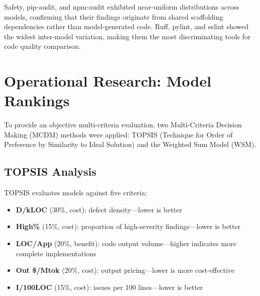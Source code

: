 Safety, pip-audit, and npm-audit exhibited near-uniform distributions across models, confirming that their findings originate from shared scaffolding dependencies rather than model-generated code. Ruff, pylint, and eslint showed the widest inter-model variation, making them the most discriminating tools for code quality comparison.

\section{Operational Research: Model Rankings}
\label{sec:model_rankings}

To provide an objective multi-criteria evaluation, two Multi-Criteria Decision Making (MCDM) methods were applied: TOPSIS (Technique for Order of Preference by Similarity to Ideal Solution) and the Weighted Sum Model (WSM).

\subsection{TOPSIS Analysis}

TOPSIS evaluates models against five criteria:

\begin{itemize}
    \item \textbf{D/kLOC} (30\%, cost): defect density---lower is better
    \item \textbf{High\%} (15\%, cost): proportion of high-severity findings---lower is better
    \item \textbf{LOC/App} (20\%, benefit): code output volume---higher indicates more complete implementations
    \item \textbf{Out \$/Mtok} (20\%, cost): output pricing---lower is more cost-effective
    \item \textbf{I/100LOC} (15\%, cost): issues per 100 lines---lower is better
\end{itemize}

